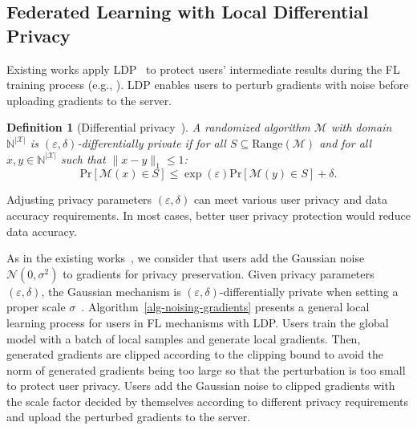 \documentclass[lettersize,journal]{IEEEtran}
\newtheorem{definition}{Definition}
\begin{document}
\subsection{Federated Learning with Local Differential Privacy}
\label{section-preliminary-fl-ldp}

Existing works apply LDP~\cite{dwork2014algorithmic} to protect users' intermediate results during the FL training process (e.g., \cite{Kang2020FLwithDP, Zhou2022Differentially, Rui2020Personalized, Stevens2022Efficient, mcmahan2018learning}). LDP enables users to perturb gradients with noise before uploading gradients to the server.
\begin{definition}[Differential privacy~\cite{dwork2014algorithmic}]
A randomized algorithm $\mathcal{M}$ with domain $\mathbb{N}^{\left| \mathcal{X} \right| }$ is $\left(\varepsilon, \delta \right)$-differentially private if for all $S \subseteq \mathrm{Range}\left(\mathcal{M}\right) $ and for all $x,y \in \mathbb{N}^{\left| \mathcal{X} \right| }$ such that $\| x - y\|_1 \leq 1$:
\begin{equation}
\mathrm{Pr}\left[ \mathcal{M}\left(x\right) \in S \right] \leq \exp\left(\varepsilon\right) \mathrm{Pr}\left[\mathcal{M}\left(y\right) \in S \right] + \delta.
\end{equation}
\end{definition}
Adjusting privacy parameters $\left(\varepsilon, \delta \right)$ can meet various user privacy and data accuracy requirements. In most cases, better user privacy protection would reduce data accuracy.

As in the existing works~\cite{Kang2020FLwithDP, Zhou2022Differentially, Naseri2022local, Rui2020Personalized}, we consider that users add the Gaussian noise $\mathcal{N}\left(0, \sigma^2 \right)$ to gradients for privacy preservation. Given privacy parameters $\left(\varepsilon, \delta \right)$, the Gaussian mechanism is $\left(\varepsilon, \delta \right)$-differentially private when setting a proper scale $\sigma$~\cite{dwork2014algorithmic}. Algorithm~\ref{alg-noising-gradients} presents a general local learning process for users in FL mechanisms with LDP. Users train the global model with a batch of local samples and generate local gradients. Then, generated gradients are clipped according to the clipping bound to avoid the norm of generated gradients being too large so that the perturbation is too small to protect user privacy. Users add the Gaussian noise to clipped gradients with the scale factor decided by themselves according to different privacy requirements and upload the perturbed gradients to the server.
\end{document}
